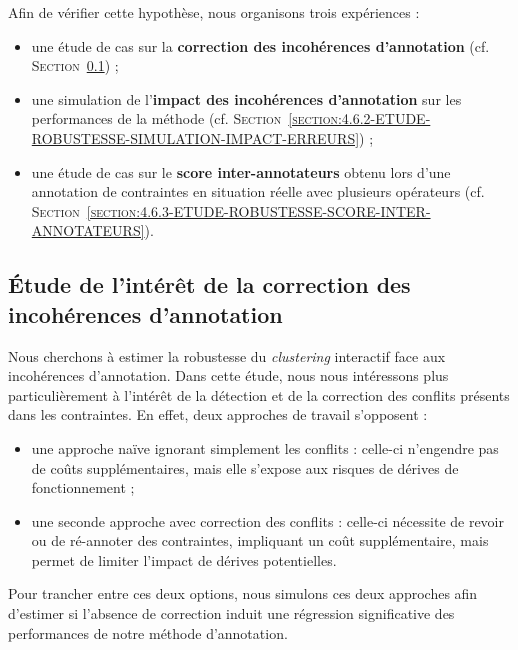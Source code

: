 	Afin de vérifier cette hypothèse, nous organisons trois expériences :
	\begin{itemize}
		\item une étude de cas sur la \textbf{correction des incohérences d'annotation} (cf. \textsc{Section~\ref{section:4.6.1-ETUDE-ROBUSTESSE-INTERETS-CORRECTION-ERREURS}}) ;
		\item une simulation de l'\textbf{impact des incohérences d'annotation} sur les performances de la méthode (cf. \textsc{Section~\ref{section:4.6.2-ETUDE-ROBUSTESSE-SIMULATION-IMPACT-ERREURS}}) ;
		\item une étude de cas sur le \textbf{score inter-annotateurs} obtenu lors d'une annotation de contraintes en situation réelle avec plusieurs opérateurs (cf. \textsc{Section~\ref{section:4.6.3-ETUDE-ROBUSTESSE-SCORE-INTER-ANNOTATEURS}}).
	\end{itemize}
	
	
	\subsection{Étude de l'intérêt de la correction des incohérences d'annotation}
	\label{section:4.6.1-ETUDE-ROBUSTESSE-INTERETS-CORRECTION-ERREURS}
		
		Nous cherchons à estimer la robustesse du \textit{clustering} interactif face aux incohérences d'annotation.
		Dans cette étude, nous nous intéressons plus particulièrement à l'intérêt de la détection et de la correction des conflits présents dans les contraintes.
		En effet, deux approches de travail s'opposent :
		\begin{itemize}
			\item une approche naïve ignorant simplement les conflits : celle-ci n'engendre pas de coûts supplémentaires, mais elle s'expose aux risques de dérives de fonctionnement ;
			\item une seconde approche avec correction des conflits : celle-ci nécessite de revoir ou de ré-annoter des contraintes, impliquant un coût supplémentaire, mais permet de limiter l'impact de dérives potentielles.
		\end{itemize}
		Pour trancher entre ces deux options, nous simulons ces deux approches afin d'estimer si l'absence de correction induit une régression significative des performances de notre méthode d'annotation.
	

